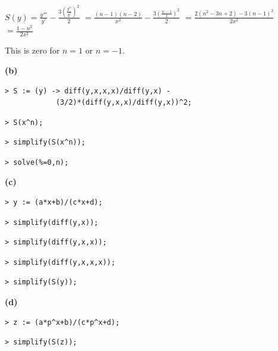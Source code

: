 \documentclass{article}
\begin{document}
\begin{Maple Normal}

$S (y)=\frac{\mathit{y'''}}{\mathit{y'}}-\frac{3 (\frac{\mathit{y''}}{\mathit{y'}})^{2}}{2}$ 
$=\frac{(n -1) (n -2)}{x^{2}}-\frac{3 (\frac{n -1}{x})^{2}}{2}$
$=\frac{2 (n^{2}-3 n +2)-3 (n -1)^{2}}{2 x^{2}}$
$=\frac{1-n^{2}}{2 x^{2}}$
\end{Maple Normal}
\begin{Maple Normal}

\end{Maple Normal}
\begin{Maple Normal}
This is zero for 
$n =1$ or 
$n =-1$.
\end{Maple Normal}
\begin{Maple Normal}
\textbf{(b)}
\end{Maple Normal}
\begin{lstlisting}
> S := (y) -> diff(y,x,x,x)/diff(y,x) - 
            (3/2)*(diff(y,x,x)/diff(y,x))^2;
\end{lstlisting}
\begin{lstlisting}
> S(x^n);
\end{lstlisting}
\begin{lstlisting}
> simplify(S(x^n));
\end{lstlisting}
\begin{lstlisting}
> solve(%=0,n);
\end{lstlisting}
\begin{Maple Normal}
\textbf{(c)}
\end{Maple Normal}
\begin{lstlisting}
> y := (a*x+b)/(c*x+d);
\end{lstlisting}
\begin{lstlisting}
> simplify(diff(y,x));
\end{lstlisting}
\begin{lstlisting}
> simplify(diff(y,x,x));
\end{lstlisting}
\begin{lstlisting}
> simplify(diff(y,x,x,x));
\end{lstlisting}
\begin{lstlisting}
> simplify(S(y));
\end{lstlisting}
\begin{Maple Normal}
\textbf{(d)}
\end{Maple Normal}
\begin{lstlisting}
> z := (a*p^x+b)/(c*p^x+d);
\end{lstlisting}
\begin{lstlisting}
> simplify(S(z));
\end{lstlisting}
\end{document}
